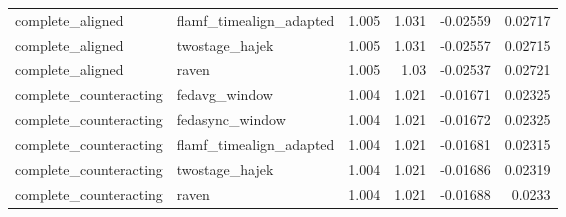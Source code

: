 \begin{tabular}{llrrrr}
complete_aligned & flamf_timealign_adapted & 1.005 & 1.031 & -0.02559 & 0.02717 \\
complete_aligned & twostage_hajek & 1.005 & 1.031 & -0.02557 & 0.02715 \\
complete_aligned & raven & 1.005 & 1.03 & -0.02537 & 0.02721 \\
complete_counteracting & fedavg_window & 1.004 & 1.021 & -0.01671 & 0.02325 \\
complete_counteracting & fedasync_window & 1.004 & 1.021 & -0.01672 & 0.02325 \\
complete_counteracting & flamf_timealign_adapted & 1.004 & 1.021 & -0.01681 & 0.02315 \\
complete_counteracting & twostage_hajek & 1.004 & 1.021 & -0.01686 & 0.02319 \\
complete_counteracting & raven & 1.004 & 1.021 & -0.01688 & 0.0233 \\
\bottomrule
\end{tabular}
